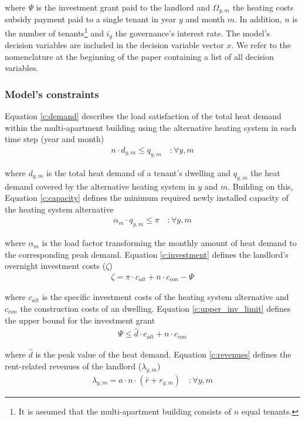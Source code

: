 where $\Psi$ is the investment grant paid to the landlord and $\Omega_{y,m}$ the heating costs subsidy payment paid to a single tenant in year $y$ and month $m$. In addition, $n$ is the number of tenants\footnote{It is assumed that the multi-apartment building consists of $n$ equal tenants.} and $i_g$ the governance's interest rate. The model's decision variables are included in the decision variable vector $x$. We refer to the nomenclature at the beginning of the paper containing a list of all decision variables.

\subsubsection{Model's constraints}
Equation \ref{c:demand} describes the load satisfaction of the total heat demand within the multi-apartment building using the alternative heating system in each time step (year and month) 
\begin{align}\label{c:demand}
n \cdot d_{y,m} \leq q_{y,m} \quad :\forall y,m
\end{align}

where $d_{y,m}$ is the total heat demand of a tenant's dwelling and $q_{y,m}$ the heat demand covered by the alternative heating system in $y$ and $m$. Building on this, Equation \ref{c:capacity} defines the minimum required newly installed capacity of the heating system alternative
\begin{align}\label{c:capacity}
\alpha_{m} \cdot q_{y,m} \leq \pi \quad :\forall y,m
\end{align}

where $\alpha_{m}$ is the load factor transforming the monthly amount of heat demand to the corresponding peak demand. Equation \ref{c:investment} defines the landlord's overnight investment costs ($\zeta$)
\begin{align}\label{c:investment}
\zeta = \pi \cdot c_{alt} + n \cdot c_{con} - \Psi
\end{align}

where $c_{alt}$ is the specific investment costs of the heating system alternative and $c_{con}$ the construction costs of an dwelling. Equation \ref{c:upper_inv_limit} defines the upper bound for the investment grant 
\begin{align}\label{c:upper_inv_limit}
\Psi \leq \hat{d} \cdot c_{alt} + n \cdot c_{con}
\end{align}

where $\hat{d}$ is the peak value of the heat demand. Equation \ref{c:revenues} defines the rent-related revenues of the landlord ($\lambda_{y,m}$)
\begin{align}\label{c:revenues}
\lambda_{y,m} = a \cdot n \cdot (\bar{r} + r_{y,m}) \quad :\forall y,m
\end{align}

